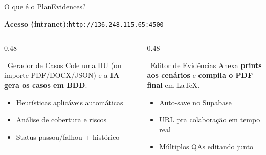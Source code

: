 \documentclass[aspectratio=169,12pt]{beamer}
\begin{document}
\begin{frame}{O que é o PlanEvidences?}
  \begin{center}
    \textbf{Acesso (intranet):}\quad\texttt{\color{peGreen}\large http://136.248.115.65:4500}
  \end{center}
  \vspace{0.5em}
  \begin{columns}[T]
    \begin{column}{0.48\textwidth}
      \begin{block}{\faRocket~Gerador de Casos}
        Cole uma HU (ou importe PDF/DOCX/JSON) e a \textbf{IA gera os casos em BDD}.
      \end{block}
      \vspace{0.3em}
      \small
      \begin{itemize}
        \item Heurísticas aplicáveis automáticas
        \item Análise de cobertura e riscos
        \item Status passou/falhou + histórico
      \end{itemize}
    \end{column}
    \begin{column}{0.48\textwidth}
      \begin{block}{\faClipboard~Editor de Evidências}
        Anexa \textbf{prints aos cenários} e \textbf{compila o PDF final} em LaTeX.
      \end{block}
      \vspace{0.3em}
      \small
      \begin{itemize}
        \item Auto-save no Supabase
        \item URL pra colaboração em tempo real
        \item Múltiplos QAs editando junto
      \end{itemize}
    \end{column}
  \end{columns}
\end{frame}
\end{document}
